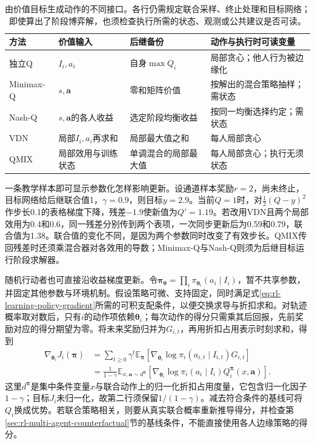\begin{table}[htbp]
 \centering
 \begin{tabularx}{\linewidth}{@{}l >{\raggedright\arraybackslash}X >{\raggedright\arraybackslash}X >{\raggedright\arraybackslash}X@{}}
 \toprule
 方法 & 价值输入 & 后继备份 & 动作与执行时可读变量\\
 \midrule
 独立Q & $I_i,a_i$ & 自身$\max Q_i$ & 局部贪心；他人行为被边缘化\\
 Minimax-Q & $s,\bm a$ & 零和矩阵价值 & 按解出的混合策略抽样；需状态\\
 Nash-Q & $s,\bm a$的各人收益 & 选定阶段均衡收益 & 按同一均衡选择约定；需状态\\
 VDN & 局部$I_i,a_i$再求和 & 局部最大值之和 & 每人局部贪心\\
 QMIX & 局部效用与训练状态 & 单调混合的局部最大值 & 每人局部贪心；执行无须状态\\
 \bottomrule
 \end{tabularx}
 \caption{由价值目标生成动作的不同接口。各行仍需规定联合采样、终止处理和目标网络；即使算出了阶段博弈解，也须检查执行所需的状态、观测或公共建议是否可读。}
 \label{tab:rl-multi-agent-value-updates}
\end{table}

一条教学样本即可显示参数化怎样影响更新。设通道样本奖励$r=2$，尚未终止，目标网络给后继联合值1，$\gamma=0.9$，则目标$y=2.9$。当前$Q=1$时，对$\tfrac12(Q-y)^2$作步长0.1的表格梯度下降，残差$-1.9$使新值为$Q'=1.19$。若改用VDN且两个局部效用为0.4和0.6，同一残差分别传到两个表项，一次同步更新后为0.59和0.79，联合值为1.38。联合值的变化不同，是因为两个参数同时改变了有效步长。QMIX传回残差时还须乘混合器对各效用的导数；Minimax-Q与Nash-Q则须为后继目标运行阶段求解器。

随机行动者也可直接沿收益梯度更新。令$\bm\pi_{\bm\theta}=\prod_i\pi_{\bm\theta_i}(a_i\mid I_i)$，暂不共享参数，并固定其他参数与环境机制。假设策略可微、支持固定，同时满足式\eqref{eq:rl-learning-policy-gradient}所需的可积支配条件，以便交换求导与折扣求和。对轨迹概率取对数后，只有$i$的动作项依赖$\bm\theta_i$；每次动作的得分只需乘其后回报，先前奖励对应的得分期望为零。将未来奖励归并为$G_{i,t}$，再用折扣占用表示时刻求和，得到
\begin{align}
 \nabla_{\bm\theta_i}J_i(\bm\pi)
 &=\sum_{t\geq0}\gamma^t
   \mathbb E_{\bm\pi}
   [\nabla_{\bm\theta_i}\log\pi_i(a_{i,t}\mid I_{i,t})G_{i,t}]
 \nonumber\\
 &=\frac{1}{1-\gamma}
   \mathbb E_{x,\bm a\sim d^{\bm\pi}}
   [\nabla_{\bm\theta_i}\log\pi_i(a_i\mid I_i)
           Q_i^{\bm\pi}(x,\bm a)].
 \label{eq:rl-multi-agent-policy-gradient}
\end{align}
这里$d^{\bm\pi}$是集中条件变量$x$与联合动作上的归一化折扣占用度量，它包含归一化因子$1-\gamma$；目标$J_i$未归一化，故第二行须保留$1/(1-\gamma)$。减去符合条件的基线可将$Q_i$换成优势。若联合策略相关，则要从真实联合概率重新推导得分，并检查第\ref{sec:rl-multi-agent-counterfactual}节的基线条件，不能直接使用各人边缘策略的得分。

